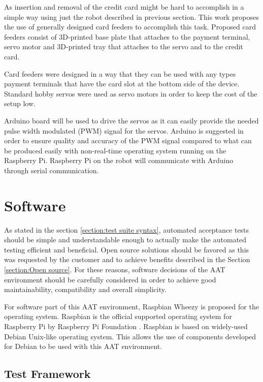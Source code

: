 As insertion and removal of the credit card might be hard to accomplish in a simple way using just the robot described in previous section. This work proposes the use of generally designed card feeders to accomplish this task. Proposed card feeders consist of 3D-printed base plate that attaches to the payment terminal, servo motor and 3D-printed tray that attaches to the servo and to the credit card.

Card feeders were designed in a way that they can be used with any types payment terminals that have the card slot at the bottom side of the device. Standard hobby servos were used as servo motors in order to keep the cost of the setup low.

Arduino board will be used to drive the servos as it can easily provide the needed pulse width modulated (PWM) signal for the servos. Arduino is suggested in order to ensure quality and accuracy of the PWM signal compared to what can be produced easily with non-real-time operating system running on the Raspberry Pi. Raspberry Pi on the robot will communicate with Arduino through serial communication.

\section{Software}
\label{section:software}

As stated in the section \ref{section:test suite syntax}, automated acceptance tests should be simple and understandable enough to actually make the automated testing efficient and beneficial. Open source solutions should be favored as this was requested by the customer and to achieve benefits described in the Section \ref{section:Open source}. For these reasons, software decisions of the AAT environment should be carefully considered in order to achieve good maintainability, compatibility and overall simplicity.

For software part of this AAT environment, Raspbian Wheezy is proposed for the operating system. Raspbian is the official supported operating system for Raspberry Pi by Raspberry Pi Foundation \citep{raspbian}. Raspbian is based on widely-used Debian Unix-like operating system. This allows the use of components developed for Debian to be used with this AAT environment.

\FloatBarrier
\subsection{Test Framework}
\label{subsection:test framework}

